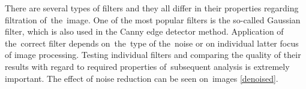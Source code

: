 There are several types of filters and they all differ in their properties regarding filtration of~the~image. One of the most popular filters is the so-called Gaussian filter, which is also used in the Canny edge detector method. Application of the~correct filter depends on~the~type of the~noise or on individual latter focus of image processing. Testing individual filters and comparing the quality of their results with regard to required properties of~subsequent analysis is extremely important. The effect of noise reduction can be seen on~images \ref{denoised}.

\begin{figure}[!ht]
    \centering
    \begin{subfigure}[b]{.45\textwidth}
    \centering
        \caption{}\label{classic-img}
    \end{subfigure}
    \begin{subfigure}[b]{.45\textwidth}
    \centering

\end{subfigure}
\end{figure}
